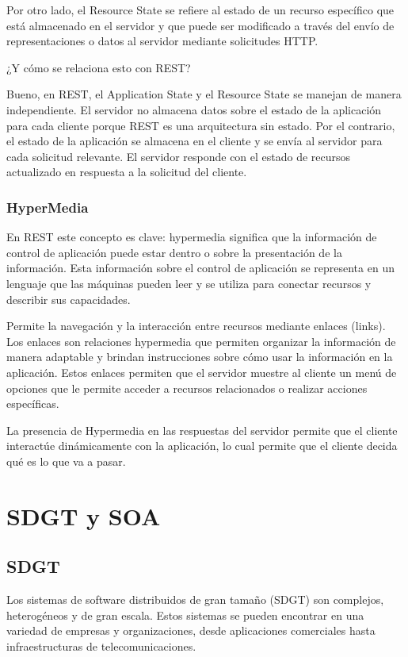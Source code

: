 \documentclass{article}
\begin{document}
		Por otro lado, el Resource State se refiere al estado de un recurso específico que está almacenado en el servidor y que puede ser modificado a través del envío de representaciones o datos al servidor mediante solicitudes HTTP.

		¿Y cómo se relaciona esto con REST?
		
		Bueno, en REST, el Application State y el Resource State se manejan de manera independiente. El servidor no almacena datos sobre el estado de la aplicación para cada cliente porque REST es una arquitectura sin estado. Por el contrario, el estado de la aplicación se almacena en el cliente y se envía al servidor para cada solicitud relevante. El servidor responde con el estado de recursos actualizado en respuesta a la solicitud del cliente.
		
		\subsubsection{HyperMedia}\label{sec:hypermedia}
		
		En REST este concepto es clave: hypermedia significa que la información de control de aplicación puede estar dentro o sobre la presentación de la información. Esta información sobre el control de aplicación se representa en un lenguaje que las máquinas pueden leer y se utiliza para conectar recursos y describir sus capacidades.
		
		Permite la navegación y la interacción entre recursos mediante enlaces (links). Los enlaces son relaciones hypermedia que permiten organizar la información de manera adaptable y brindan instrucciones sobre cómo usar la información en la aplicación. Estos enlaces permiten que el servidor muestre al cliente un menú de opciones que le permite acceder a recursos relacionados o realizar acciones específicas.
		
		La presencia de Hypermedia en las respuestas del servidor permite que el cliente interactúe dinámicamente con la aplicación, lo cual permite que el cliente decida qué es lo que va a pasar.
		
		
		
		\section{SDGT y SOA}
		
		\subsection{SDGT}
			Los sistemas de software distribuidos de gran tamaño (SDGT) son complejos, heterogéneos y de gran escala. Estos sistemas se pueden encontrar en una variedad de empresas y organizaciones, desde aplicaciones comerciales hasta infraestructuras de telecomunicaciones.
			
\end{document}
